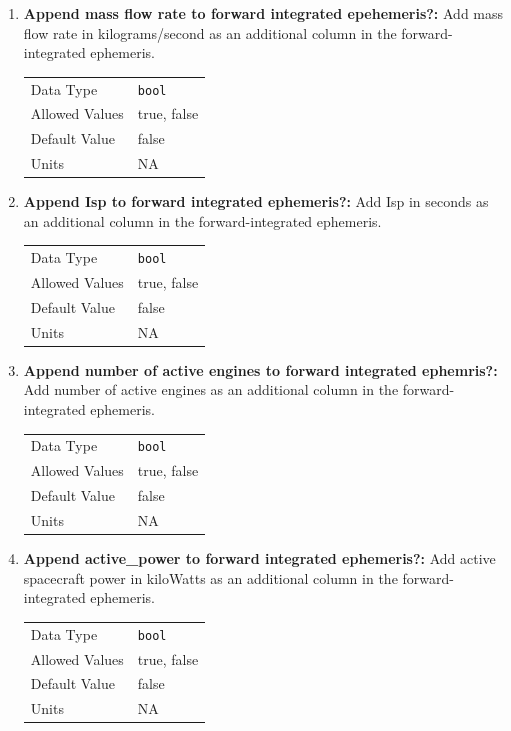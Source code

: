 \begin{enumerate}
\item{\textbf{Append mass flow rate to forward integrated epehemeris?:}} Add mass flow rate in kilograms/second as an additional column in the forward-integrated ephemeris.
    \begin{table}[H]
        \hspace{2cm}
        \begin{tabular}{ll}
        Data Type & \verb|bool| \\
        Allowed Values & true, false \\
        Default Value & false \\
        Units & NA
        \end{tabular}
    \end{table}
\item{\textbf{Append Isp to forward integrated ephemeris?:}} Add Isp in seconds as an additional column in the forward-integrated ephemeris.
    \begin{table}[H]
        \hspace{2cm}
        \begin{tabular}{ll}
        Data Type & \verb|bool| \\
        Allowed Values & true, false \\
        Default Value & false \\
        Units & NA
    \end{tabular}
\end{table}
\item{\textbf{Append number of active engines to forward integrated ephemris?:}} Add number of active engines as an additional column in the forward-integrated ephemeris.
    \begin{table}[H]
        \hspace{2cm}
        \begin{tabular}{ll}
        Data Type & \verb|bool| \\
        Allowed Values & true, false \\
        Default Value & false \\
        Units & NA
        \end{tabular}
    \end{table}

\item{\textbf{Append active\_power to forward integrated ephemeris?:}} Add active spacecraft power in kiloWatts as an additional column in the forward-integrated ephemeris.
    \begin{table}[H]
        \hspace{2cm}
        \begin{tabular}{ll}
        Data Type & \verb|bool| \\
        Allowed Values & true, false \\
        Default Value & false \\
        Units & NA
        \end{tabular}
    \end{table}


\end{enumerate}
